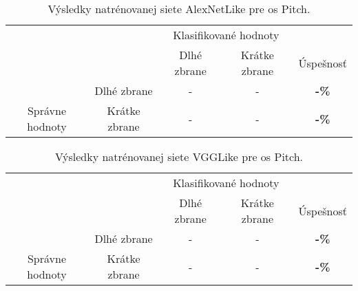 \begin{table}[H]
    \centering
    \begin{tabular}{ccccc}
                                                                &                                    & \multicolumn{2}{c}{Klasifikované hodnoty}                                                         &                                    \\ \cline{3-5} 
                                                                & \multicolumn{1}{c|}{}              & \multicolumn{1}{c|}{Dlhé zbrane}                & \multicolumn{1}{c|}{Krátke zbrane}              & \multicolumn{1}{c|}{Úspešnosť}     \\ \cline{2-5} 
        \multicolumn{1}{c|}{}                                  & \multicolumn{1}{c|}{Dlhé zbrane}   & \multicolumn{1}{c|}{{\color[HTML]{009901} -}} & \multicolumn{1}{c|}{{\color[HTML]{9A0000} -}}  & \multicolumn{1}{c|}{\textbf{-\%}} \\ \cline{2-5} 
        \multicolumn{1}{c|}{\multirow{-2}{*}{Správne hodnoty}} & \multicolumn{1}{c|}{Krátke zbrane} & \multicolumn{1}{c|}{{\color[HTML]{9A0000} -}}  & \multicolumn{1}{c|}{{\color[HTML]{009901} -}} & \multicolumn{1}{c|}{\textbf{-\%}} \\ \cline{2-5} 
    \end{tabular}
    \caption{Výsledky natrénovanej siete AlexNetLike pre os Pitch.}
    \label{tab:alexnetpitchresults}
\end{table}

\begin{table}[H]
    \centering
    \begin{tabular}{ccccc}
                                                                &                                    & \multicolumn{2}{c}{Klasifikované hodnoty}                                                         &                                    \\ \cline{3-5} 
                                                                & \multicolumn{1}{c|}{}              & \multicolumn{1}{c|}{Dlhé zbrane}                & \multicolumn{1}{c|}{Krátke zbrane}              & \multicolumn{1}{c|}{Úspešnosť}     \\ \cline{2-5} 
        \multicolumn{1}{c|}{}                                  & \multicolumn{1}{c|}{Dlhé zbrane}   & \multicolumn{1}{c|}{{\color[HTML]{009901} -}} & \multicolumn{1}{c|}{{\color[HTML]{9A0000} -}}  & \multicolumn{1}{c|}{\textbf{-\%}} \\ \cline{2-5} 
        \multicolumn{1}{c|}{\multirow{-2}{*}{Správne hodnoty}} & \multicolumn{1}{c|}{Krátke zbrane} & \multicolumn{1}{c|}{{\color[HTML]{9A0000} -}}  & \multicolumn{1}{c|}{{\color[HTML]{009901} -}} & \multicolumn{1}{c|}{\textbf{-\%}} \\ \cline{2-5} 
    \end{tabular}
    \caption{Výsledky natrénovanej siete VGGLike pre os Pitch.}
    \label{tab:vgglikepitchresults}
\end{table}


